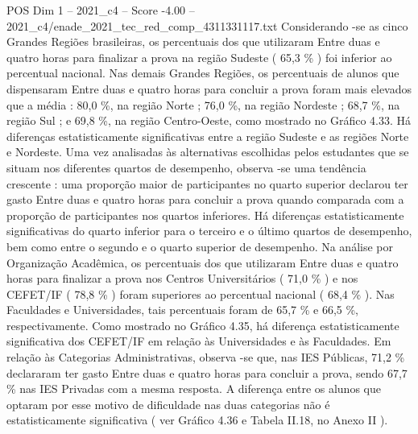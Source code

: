 \begin{textsample}{POS Dim 1 – 2021\_c4 – Score -4.00 – 2021\_c4/enade\_2021\_tec\_red\_comp\_4311331117.txt}
Considerando -se as cinco Grandes Regiões brasileiras, os percentuais dos que utilizaram Entre duas e quatro horas para finalizar a prova na região Sudeste ( 65,3 \% ) foi inferior ao percentual nacional.
Nas demais Grandes Regiões, os percentuais de alunos que dispensaram Entre duas e quatro horas para concluir a prova foram mais elevados que a média : 80,0 \%, na região Norte ; 76,0 \%, na região Nordeste ; 68,7 \%, na região Sul ; e 69,8 \%, na região Centro-Oeste, como mostrado no Gráfico 4.33.
Há diferenças estatisticamente significativas entre a região Sudeste e as regiões Norte e Nordeste.
Uma vez analisadas às alternativas escolhidas pelos estudantes que se situam nos diferentes quartos de desempenho, observa -se uma tendência crescente : uma proporção maior de participantes no quarto superior declarou ter gasto Entre duas e quatro horas para concluir a prova quando comparada com a proporção de participantes nos quartos inferiores.
Há diferenças estatisticamente significativas do quarto inferior para o terceiro e o último quartos de desempenho, bem como entre o segundo e o quarto superior de desempenho.
Na análise por Organização Acadêmica, os percentuais dos que utilizaram Entre duas e quatro horas para finalizar a prova nos Centros Universitários ( 71,0 \% ) e nos CEFET/IF ( 78,8 \% ) foram superiores ao percentual nacional ( 68,4 \% ).
Nas Faculdades e Universidades, tais percentuais foram de 65,7 \% e 66,5 \%, respectivamente.
Como mostrado no Gráfico 4.35, há diferença estatisticamente significativa dos CEFET/IF em relação às Universidades e às Faculdades.
Em relação às Categorias Administrativas, observa -se que, nas IES Públicas, 71,2 \% declararam ter gasto Entre duas e quatro horas para concluir a prova, sendo 67,7 \% nas IES Privadas com a mesma resposta.
A diferença entre os alunos que optaram por esse motivo de dificuldade nas duas categorias não é estatisticamente significativa ( ver Gráfico 4.36 e Tabela II.18, no Anexo II ).

\end{textsample}
